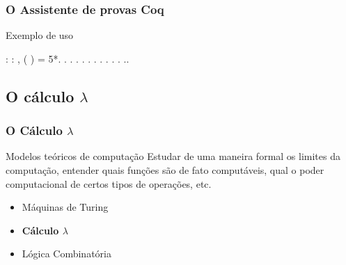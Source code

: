 \documentclass{beamer}
\begin{document}

\begin{frame}
\frametitle{O Assistente de provas Coq}
   \begin{block}{ Exemplo de uso }
       
     :
    \coqdockw{\ensuremath{\forall}}  : ,
    ( ) = 5*.\coqdoceol \coqdocnoindent
    .\coqdoceol \coqdocindent{2.00em} .\coqdoceol
    \coqdocindent{2.00em}  .\coqdoceol
    \coqdocindent{2.00em} . .\coqdoceol
    \coqdocindent{2.00em}  .\coqdoceol
    \coqdocindent{2.00em}  .\coqdoceol
    \coqdocindent{2.00em} .\coqdoceol \coqdocindent{2.00em}
     .\coqdoceol \coqdocindent{2.00em}
     .\coqdoceol \coqdocindent{2.00em}
    .\coqdoceol \coqdocnoindent {}.\coqdoceol

   \end{block} 
\end{frame}



\subsection{O cálculo $\lambda$}



\begin{frame}
\frametitle{O Cálculo $\lambda$}
\begin{block}{Modelos teóricos de computação}
Estudar de uma maneira formal os limites da computação, entender quais funções são de fato computáveis, qual o poder computacional de certos tipos de operações, etc.
\end{block}
\begin{itemize}
\item Máquinas de Turing
\item \textbf{Cálculo $\lambda$}
\item Lógica Combinatória
\end{itemize}
\end{frame}

\end{document}
